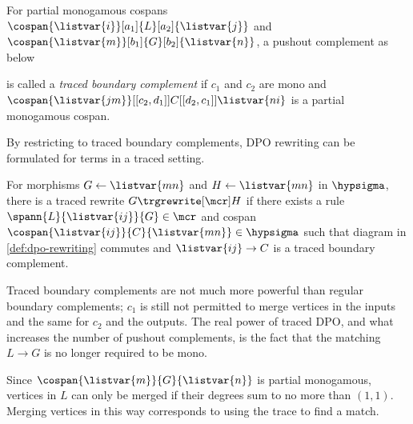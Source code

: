 \begin{definition}
    \label{def:traced-boundary-complement}
    For partial monogamous cospans \(
    \cospan{\listvar{i}}[a_1]{L}[a_2]{\listvar{j}}
    \) and \(
    \cospan{\listvar{m}}[b_1]{G}[b_2]{\listvar{n}}
    \), a pushout complement as below
    \begin{center}
    \end{center}
    is called a \emph{traced boundary complement} if \(c_1\) and \(c_2\) are
    mono and \(
    \cospan{\listvar{jm}}[[c_2,d_1]]{C}[[d_2,c_1]]{\listvar{ni}}
    \) is a partial monogamous cospan.
\end{definition}

By restricting to traced boundary complements, DPO rewriting can be formulated
for terms in a traced setting.

\begin{definition}
    For morphisms \(G \leftarrow \listvar{mn}\) and \(H \leftarrow \listvar{mn}\) in
    \(\hypsigma\), there is a traced rewrite \(G \trgrewrite[\mcr] H\) if there
    exists a rule \(
    \spann{L}{\listvar{ij}}{G} \in \mcr
    \) and cospan \(
    \cospan{\listvar{ij}}{C}{\listvar{mn}} \in \hypsigma
    \) such that diagram in \cref{def:dpo-rewriting} commutes and \(\listvar{ij} \to C\)
    is a traced boundary complement.
\end{definition}

Traced boundary complements are not much more powerful than regular boundary
complements; \(c_1\) is still not permitted to merge vertices in the inputs and
the same for \(c_2\) and the outputs.
The real power of traced DPO, and what increases the number of pushout
complements, is the fact that the matching \(L \to G\) is no longer required to
be mono.

Since \(\cospan{\listvar{m}}{G}{\listvar{n}}\) is partial monogamous, vertices
in \(L\) can only be merged if their degrees sum to no more than \((1,1)\).
Merging vertices in this way corresponds to using the trace to find a match.

